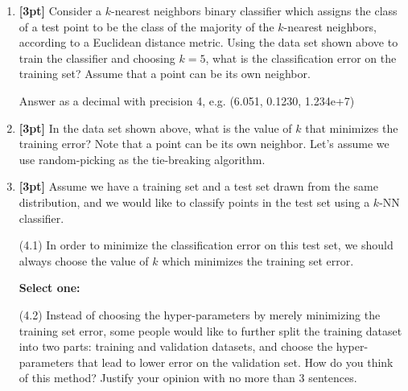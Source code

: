 \documentclass[12pt]{article}
\renewcommand{\circle}{\tikz\draw[black] (0,0) circle (1ex);}
\begin{document}
\begin{enumerate}
    \item \textbf{[3pt]} Consider a $k$-nearest neighbors binary classifier which assigns the class of a test point to be the class of the majority of the $k$-nearest neighbors, according to a Euclidean distance metric. Using the data set shown above to train the classifier and choosing $k=5$, what is the classification error on the training set? Assume that a point can be its own neighbor.
    
    Answer as a decimal with precision 4, e.g. (6.051, 0.1230, 1.234e+7)
    
    \begin{tcolorbox}[fit,height=1cm, width=4cm, blank, borderline={1pt}{-2pt},nobeforeafter]
    \end{tcolorbox}
 
    
    
    \item \textbf{[3pt]} In the data set shown above, what is the value of $k$ that minimizes the training error? Note that a point can be its own neighbor. Let’s assume we use random-picking as the tie-breaking algorithm.
    
    \begin{tcolorbox}[fit,height=1cm, width=4cm, blank, borderline={1pt}{-2pt},nobeforeafter]
    \end{tcolorbox}

    
    
    \item \textbf{[3pt]} Assume we have a training set and a test set drawn from the same distribution, and we would like to classify points in the test set using a $k$-NN classifier. 
    
    (4.1) In order to minimize the classification error on this test set, we should always choose the value of $k$ which minimizes the training set error. 
    
    \textbf{Select one:}
    
    (4.2) Instead of choosing the hyper-parameters by merely minimizing the training set error, some people would like to further split the training dataset into two parts: training and validation datasets, and choose the hyper-parameters that lead to lower error on the validation set. How do you think of this method? Justify your opinion with no more than 3 sentences.


\end{enumerate}
\end{document}
